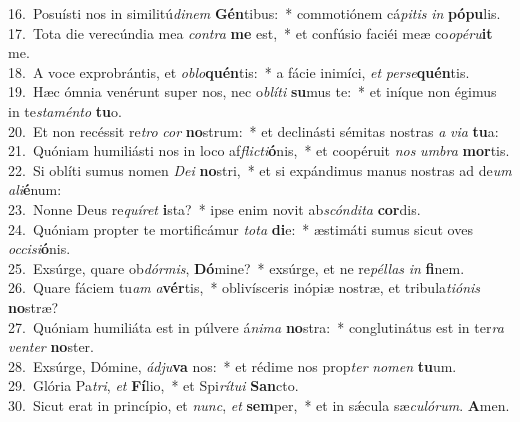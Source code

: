 {16.~}Posuísti nos in similitú\textit{di}\textit{nem} \textbf{Gén}tibus:~* commotiónem cá\textit{pi}\textit{tis} \textit{in} \textbf{pó}\textbf{pu}lis.\\
{17.~}Tota die verecúndia mea \textit{con}\textit{tra} \textbf{me} est,~* et confúsio faciéi meæ co\textit{o}\textit{pé}\textit{ru}\textbf{it} me.\\
{18.~}A voce exprobrántis, et \textit{o}\textit{blo}\textbf{quén}tis:~* a fácie inimíci, \textit{et} \textit{per}\textit{se}\textbf{quén}tis.\\
{19.~}Hæc ómnia venérunt super nos, nec o\textit{blí}\textit{ti} \textbf{su}mus te:~* et iníque non égimus in te\textit{sta}\textit{mén}\textit{to} \textbf{tu}o.\\
{20.~}Et non recéssit re\textit{tro} \textit{cor} \textbf{no}strum:~* et declinásti sémitas nostras \textit{a} \textit{vi}\textit{a} \textbf{tu}a:\\
{21.~}Quóniam humiliásti nos in loco af\textit{fli}\textit{cti}\textbf{ó}nis,~* et coopéruit \textit{nos} \textit{um}\textit{bra} \textbf{mor}tis.\\
{22.~}Si oblíti sumus nomen \textit{De}\textit{i} \textbf{no}stri,~* et si expándimus manus nostras ad de\textit{um} \textit{a}\textit{li}\textbf{é}num:\\
{23.~}Nonne Deus re\textit{quí}\textit{ret} \textbf{i}sta?~* ipse enim novit ab\textit{scón}\textit{di}\textit{ta} \textbf{cor}dis.\\
{24.~}Quóniam propter te mortificámur \textit{to}\textit{ta} \textbf{di}e:~* æstimáti sumus sicut oves \textit{oc}\textit{ci}\textit{si}\textbf{ó}nis.\\
{25.~}Exsúrge, quare ob\textit{dór}\textit{mis}, \textbf{Dó}mine?~* exsúrge, et ne re\textit{pél}\textit{las} \textit{in} \textbf{fi}nem.\\
{26.~}Quare fáciem tu\textit{am} \textit{a}\textbf{vér}tis,~* oblivísceris inópiæ nostræ, et tribula\textit{ti}\textit{ó}\textit{nis} \textbf{no}stræ?\\
{27.~}Quóniam humiliáta est in púlvere á\textit{ni}\textit{ma} \textbf{no}stra:~* conglutinátus est in ter\textit{ra} \textit{ven}\textit{ter} \textbf{no}ster.\\
{28.~}Exsúrge, Dómine, \textit{ád}\textit{ju}\textbf{va} nos:~* et rédime nos prop\textit{ter} \textit{no}\textit{men} \textbf{tu}um.\\
{29.~}Glória Pa\textit{tri}, \textit{et} \textbf{Fí}lio,~* et Spi\textit{rí}\textit{tu}\textit{i} \textbf{San}cto.\\
{30.~}Sicut erat in princípio, et \textit{nunc}, \textit{et} \textbf{sem}per,~* et in sǽcula sæ\textit{cu}\textit{ló}\textit{rum}. \textbf{A}men.\\
